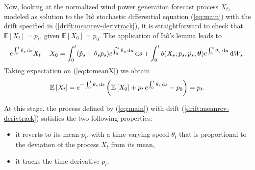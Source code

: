 \documentclass[11pt]{article}
\theoremstyle{definition}
\begin{document}
Now, looking at the normalized wind power generation forecast process $X_t$, modeled as solution to the It\^{o} stochastic differential equation (\ref{eq:main}) with the drift specified in (\ref{drift:meanrev-derivtrack}), it is straightforward to check that $\mathbb{E} \left[X_t\right] = p_t$, given $  \mathbb{E}\left[X_0\right] = p_0$. The application of  It\^{o}'s lemma %
leads to
\begin{equation}
e^{\int_{0}^{t} \theta_s \dif s}  X_t - X_0 = \int_{0}^{t}  (\dot{p}_s + \theta_s p_s ) e^{\int_{0}^{s} \theta_u \dif u} \dif s + \int_{0}^{t}  b (X_s; p_s, \dot{p}_s, \bm{\theta} )  e^{\int_{0}^{s} \theta_u \dif u}\dif  W_s.   \label{eq:tomeanX}
\end{equation} 
Taking expectation on (\ref{eq:tomeanX}) we obtain
\begin{equation}
\mathbb{E} \left[X_t\right] =  e^{ - \int_{0}^{t} \theta_s \dif s} \left(  \mathbb{E}\left[ X_0\right] + p_t \, e^{ \int_{0}^{t} \theta_s \dif s} - p_0 \right) = p_t.
\label{eq:meanX}
\end{equation}

 At this stage, the process defined by (\ref{eq:main}) with drift (\ref{drift:meanrev-derivtrack}) satisfies the two following properties: 
\begin{itemize}
\item it reverts to its mean $p_t$, with a time-varying speed $ \theta_t$ that is proportional to the deviation of the process $X_t$ from its mean,
\item it tracks the time derivative $\dot{p}_t$.  
\end{itemize} 
\end{document}
